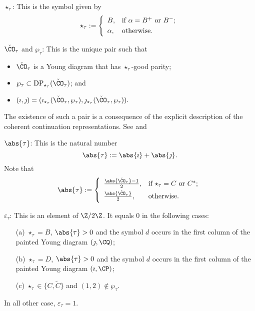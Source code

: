 \documentclass[ssunip.tex]{subfiles}
\begin{document}
 \smallskip


 \smallskip




\noindent $\star_\tau$:  This is the symbol given by
   \[
  \star_\tau:= \left\{
     \begin{array}{ll}
         B, &\hbox{if $\alpha=B^+$ or $B^-$}; \smallskip\\
            \alpha, & \hbox{otherwise}.           \end{array}
   \right.
   \]

   \noindent $\check \CO_\tau$ and $ \wp_\tau$: This is the unique pair such that
   \begin{itemize}
   \item
   $\check \CO_\tau$ is a Young diagram that has $\star_\tau$-good parity;
   \item $\wp_\tau\subset \mathrm{DP}_{\star_\tau}(\check \CO_\tau)$; and
   \item
   $
   (\imath, \jmath)=(\imath_{\star_\tau}(\check \CO_\tau, \wp_\tau), \jmath_{\star_\tau}(\check \CO_\tau, \wp_\tau)).
$
\end{itemize}
The existence of such a pair is a consequence of the explicit description of the coherent continuation representations. See   \cite[Theorems 6, 7, 10, 11]{Mc} and 
\cite[Proposition 6.9]{RT} 


 \smallskip

 \smallskip

 \noindent $\abs{\tau}$: This is the natural number \[
  \abs{\tau}:=\abs{\imath}+\abs{\jmath}.
\]
Note that
\[
 \abs{\tau}:= \left\{
     \begin{array}{ll}
        \frac{\abs{\check \CO_\tau}-1}{2}, &\hbox{if $\star_\tau=C$ or $C^*$}; \smallskip\\
          \frac{\abs{\check \CO_\tau}}{2}, &\hbox{otherwise}. \smallskip\\
                      \end{array}
   \right.
\]



 \smallskip

 \smallskip

 \noindent $\varepsilon_{\tau}$: This is an element of $\Z/2\Z$. It equals $0$ in the following cases:
   \begin{itemize}
   \item[(a)]
   $\star_\tau=B$, $\abs{\tau}>0$ and  the symbol $d$ occurs in the first column of  the painted Young diagram $(\jmath, \CQ)$;
    \item[(b)]
   $\star_\tau=D$, $\abs{\tau}>0$ and  the symbol $d$ occurs in the first column of  the painted Young diagram $(\imath, \CP)$;
   \item[(c)]
   $\star_\tau\in \{C, \widetilde C\}$ and  $(1,2)\not\in \wp_\tau$.
  \end{itemize}
In all other case, $\varepsilon_{\tau}=1$.
\end{document}
